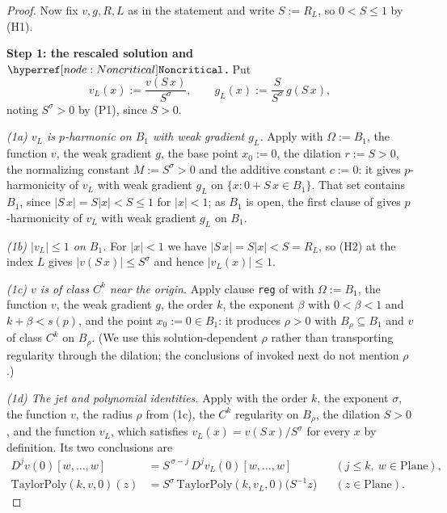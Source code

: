 \begin{proof}
Now fix $v,g,R,L$ as in the statement and write $S:=R_L$, so $0<S\le1$ by (H1).

\medskip\noindent\textbf{Step 1: the rescaled solution and $\noderef{Noncritical}$.}
Put
\[
  v_L(x):=\frac{v(S\,x)}{S^{\sigma}},\qquad g_L(x):=\frac{S}{S^{\sigma}}\,g(S\,x),
\]
noting $S^{\sigma}>0$ by (P1), since $S>0$.

\emph{(1a) $v_L$ is $p$-harmonic on $B_1$ with weak gradient $g_L$.}  Apply
 with $\Omega:=B_1$, the function $v$, the weak gradient $g$, the base
point $x_0:=0$, the dilation $r:=S>0$, the normalizing constant $M:=S^{\sigma}>0$ and the
additive constant $c:=0$: it gives $p$-harmonicity of $v_L$ with weak gradient $g_L$ on
$\{x:0+S\,x\in B_1\}$.  That set contains $B_1$, since $\lvert S\,x\rvert=S\lvert
x\rvert<S\le1$ for $\lvert x\rvert<1$; as $B_1$ is open, the first clause of
 gives $p$-harmonicity of $v_L$ with weak gradient $g_L$ on $B_1$.

\emph{(1b) $\lvert v_L\rvert\le1$ on $B_1$.}  For $\lvert x\rvert<1$ we have $\lvert S\,x\rvert
=S\lvert x\rvert<S=R_L$, so (H2) at the index $L$ gives $\lvert v(S\,x)\rvert\le S^{\sigma}$ and
hence $\lvert v_L(x)\rvert\le1$.

\emph{(1c) $v$ is of class $C^{k}$ near the origin.}  Apply clause \texttt{reg} of
 with $\Omega:=B_1$, the function $v$, the weak gradient $g$, the
order $k$, the exponent $\beta$ with $0<\beta<1$ and $k+\beta<s(p)$, and the point
$x_0:=0\in B_1$: it produces $\rho>0$ with $B_\rho\subseteq B_1$ and $v$ of class $C^{k}$ on
$B_\rho$.  (We use this solution-dependent $\rho$ rather than transporting regularity through
the dilation; the conclusions of  invoked next do not mention
$\rho$.)

\emph{(1d) The jet and polynomial identities.}  Apply  with the order
$k$, the exponent $\sigma$, the function $v$, the radius $\rho$ from (1c), the $C^{k}$
regularity on $B_\rho$, the dilation $S>0$, and the function $v_L$, which satisfies
$v_L(x)=v(S\,x)/S^{\sigma}$ for every $x$ by definition.  Its two conclusions are
\begin{align}
  D^{j}v(0)[w,\ldots,w]&=S^{\,\sigma-j}\,D^{j}v_L(0)[w,\ldots,w]
    &&(j\le k,\ w\in\mathrm{Plane}),\label{eq:afc-jet}\\
  \mathrm{TaylorPoly}(k,v,0)(z)&=S^{\sigma}\,\mathrm{TaylorPoly}(k,v_L,0)\bigl(S^{-1}z\bigr)
    &&(z\in\mathrm{Plane}).\label{eq:afc-poly}
\end{align}


\end{proof}
